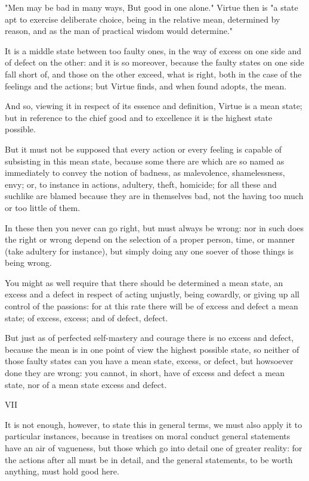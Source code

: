   "Men may be bad in many ways,
  But good in one alone."
Virtue then is "a state apt to exercise deliberate choice, being in the
relative mean, determined by reason, and as the man of practical wisdom
would determine."

It is a middle state between too faulty ones, in the way of excess on
one side and of defect on the other: and it is so moreover, because the
faulty states on one side fall short of, and those on the other exceed,
what is right, both in the case of the feelings and the actions; but
Virtue finds, and when found adopts, the mean.

And so, viewing it in respect of its essence and definition, Virtue is a
mean state; but in reference to the chief good and to excellence it is
the highest state possible.

But it must not be supposed that every action or every feeling is
capable of subsisting in this mean state, because some there are
which are so named as immediately to convey the notion of badness, as
malevolence, shamelessness, envy; or, to instance in actions, adultery,
theft, homicide; for all these and suchlike are blamed because they are
in themselves bad, not the having too much or too little of them.

In these then you never can go right, but must always be wrong: nor in
such does the right or wrong depend on the selection of a proper person,
time, or manner (take adultery for instance), but simply doing any one
soever of those things is being wrong.

You might as well require that there should be determined a mean state,
an excess and a defect in respect of acting unjustly, being cowardly, or
giving up all control of the passions: for at this rate there will be
of excess and defect a mean state; of excess, excess; and of defect,
defect.

But just as of perfected self-mastery and courage there is no excess and
defect, because the mean is in one point of view the highest possible
state, so neither of those faulty states can you have a mean state,
excess, or defect, but howsoever done they are wrong: you cannot, in
short, have of excess and defect a mean state, nor of a mean state
excess and defect.


VII

It is not enough, however, to state this in general terms, we must also
apply it to particular instances, because in treatises on moral conduct
general statements have an air of vagueness, but those which go into
detail one of greater reality: for the actions after all must be in
detail, and the general statements, to be worth anything, must hold good
here.


